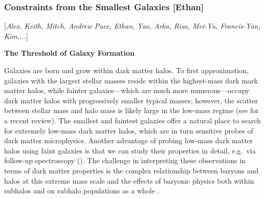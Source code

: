 \documentclass[modern,linenumbers]{aastex62}
\newcommand{\Contributors}[1]{ {\footnotesize [\textit{#1}]}}
\newcommand{\Contact}[1]{ {\footnotesize [\textbf{#1}]}}
\newcommand{\Comment}[3]{\textcolor{#1}{(#2: #3)}}
\newcommand{\YYM}[1]{\Comment{blue}{YYM}{#1}} %
\newcommand{\RHW}[1]{\Comment{blue}{RHW}{#1}} %
\newcommand{\KB}[1]{\Comment{orange}{KB}{#1}} %
\begin{document}
\subsubsection{Constraints from the Smallest Galaxies \Contact{Ethan}} 
\Contributors{Alex, Keith, Mitch, Andrew Pace, Ethan, Yao, Arka, Risa, Mei-Yu, Francis-Yan, Kim,...}
\label{sec:smallest_galaxies}


\vspace{1em} \noindent \textbf{The Threshold of Galaxy Formation}

Galaxies are born and grow within dark matter halos.
To first approximation, galaxies with the largest stellar masses reside within the highest-mass dark mark matter halos, while fainter galaxies---which are much more numerous---occupy dark matter halos with progressively smaller typical masses; however, the scatter between stellar mass and halo mass is likely large in the low-mass regime (see \citealt{Wechsler:2018} for a recent review).
The smallest and faintest galaxies offer a natural place to search for extremely low-mass dark matter halos, which are in turn sensitive probes of dark matter microphysics. Another advantage of probing low-mass dark matter halos using faint galaxies is that we can study their properties in detail, e.g.\ via follow-up spectroscopy (). The challenge in interpreting these observations in terms of dark matter properties is the complex relationship between baryons and halos at this extreme mass scale and the effects of baryonic physics both within subhalos and on subhalo populations as a whole \citep[e.g.,][]{DOnghia:2009xhq,Brooks:2012ah,errani2017,Garrison-Kimmel:2017zes,Fitts:2018ycl,brooks2018}.
\end{document}
